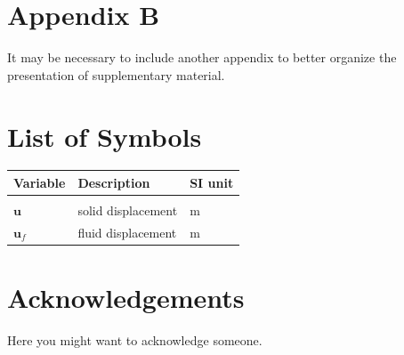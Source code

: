 \documentclass{Configuration_Files/PoliMi3i_thesis}
\begin{document}
\chapter{Appendix B}
It may be necessary to include another appendix to better organize the presentation of supplementary material.


\listoffigures

\listoftables

\chapter*{List of Symbols} %
\begin{table}[H]
    \centering
    \begin{tabular}{lll}
        \textbf{Variable} & \textbf{Description} & \textbf{SI unit} \\\hline\\[-9px]
        $\bm{u}$ & solid displacement & m \\[2px]
        $\bm{u}_f$ & fluid displacement & m \\[2px]
    \end{tabular}
\end{table}

\chapter*{Acknowledgements}
Here you might want to acknowledge someone.

\cleardoublepage
\end{document}
